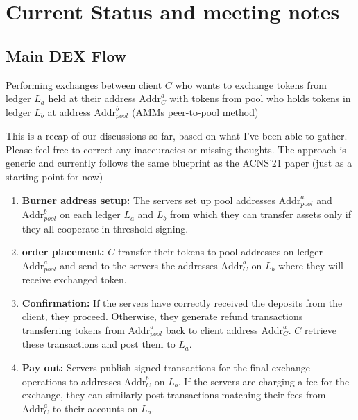 \section*{Current Status and meeting notes}

\subsection*{Main DEX Flow}

Performing exchanges between client $C$ who wants to exchange tokens from ledger $L_a$ held at their address $\text{Addr}_{C}^{a}$ with tokens from pool who holds tokens in ledger $L_b$ at address $\text{Addr}_{pool}^{b}$ (AMMs peer-to-pool method)

This is a recap of our discussions so far, based on what I’ve been able to gather. Please feel free to correct any inaccuracies or missing thoughts. The approach is generic and currently follows the same blueprint as the ACNS'21 paper (just as a starting point for now)


\begin{enumerate}
    \item \textbf{Burner address setup:} The servers set up pool addresses $\text{Addr}_{pool}^a$ and $\text{Addr}_{pool}^b$ on each ledger $L_a$ and $L_b$ from which they can transfer assets only if they all cooperate in threshold signing.
    \item \textbf{order placement:} $C$ transfer their tokens to pool addresses on ledger $\text{Addr}_{pool}^a$ and send to the servers the addresses $\text{Addr}_C^{b}$ on $L_b$ where they will receive exchanged token. 
    \item \textbf{Confirmation:} If the servers have correctly received the deposits from the client, they proceed. Otherwise, they generate refund transactions transferring tokens from $\text{Addr}_{pool}^{a}$ back to client address $\text{Addr}_C^{a}$. $C$ retrieve these transactions and post them to $L_a$.
    \item \textbf{Pay out:} Servers publish signed transactions for the final exchange operations to addresses $\text{Addr}_C^{b}$ on $L_b$. If the servers are charging a fee for the exchange, they can similarly post transactions matching their fees from $\text{Addr}_C^{a}$ to their accounts on $L_a$.
\end{enumerate}

